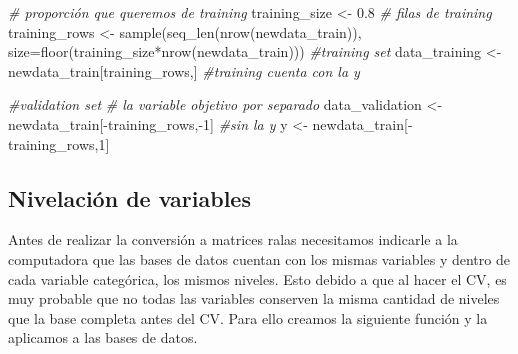 \documentclass[
]{article}
\newenvironment{Shaded}{\begin{snugshade}}{\end{snugshade}}
\newcommand{\AttributeTok}[1]{\textcolor[rgb]{0.77,0.63,0.00}{#1}}
\newcommand{\CommentTok}[1]{\textcolor[rgb]{0.56,0.35,0.01}{\textit{#1}}}
\newcommand{\DecValTok}[1]{\textcolor[rgb]{0.00,0.00,0.81}{#1}}
\newcommand{\FloatTok}[1]{\textcolor[rgb]{0.00,0.00,0.81}{#1}}
\newcommand{\FunctionTok}[1]{\textcolor[rgb]{0.00,0.00,0.00}{#1}}
\newcommand{\NormalTok}[1]{#1}
\newcommand{\OtherTok}[1]{\textcolor[rgb]{0.56,0.35,0.01}{#1}}
\newcommand{\SpecialCharTok}[1]{\textcolor[rgb]{0.00,0.00,0.00}{#1}}
\begin{document}
\begin{Shaded}
\begin{Highlighting}[]
\CommentTok{\# proporción que queremos de training}
\NormalTok{training\_size }\OtherTok{\textless{}{-}} \FloatTok{0.8}
\CommentTok{\# filas de training}
\NormalTok{training\_rows }\OtherTok{\textless{}{-}} \FunctionTok{sample}\NormalTok{(}\FunctionTok{seq\_len}\NormalTok{(}\FunctionTok{nrow}\NormalTok{(newdata\_train)),}
                        \AttributeTok{size=}\FunctionTok{floor}\NormalTok{(training\_size}\SpecialCharTok{*}\FunctionTok{nrow}\NormalTok{(newdata\_train)))}
\CommentTok{\#training set}
\NormalTok{data\_training }\OtherTok{\textless{}{-}}\NormalTok{ newdata\_train[training\_rows,]}
\CommentTok{\#training cuenta con la y}


\CommentTok{\#validation set}
\CommentTok{\# la variable objetivo por separado}
\NormalTok{data\_validation }\OtherTok{\textless{}{-}}\NormalTok{ newdata\_train[}\SpecialCharTok{{-}}\NormalTok{training\_rows,}\SpecialCharTok{{-}}\DecValTok{1}\NormalTok{] }\CommentTok{\#sin la y}
\NormalTok{y }\OtherTok{\textless{}{-}}\NormalTok{ newdata\_train[}\SpecialCharTok{{-}}\NormalTok{training\_rows,}\DecValTok{1}\NormalTok{] }
\end{Highlighting}
\end{Shaded}

\hypertarget{nivelaciuxf3n-de-variables}{%
\subsection{Nivelación de variables}\label{nivelaciuxf3n-de-variables}}

Antes de realizar la conversión a matrices ralas necesitamos indicarle a
la computadora que las bases de datos cuentan con los mismas variables y
dentro de cada variable categórica, los mismos niveles. Esto debido a
que al hacer el CV, es muy probable que no todas las variables conserven
la misma cantidad de niveles que la base completa antes del CV. Para
ello creamos la siguiente función y la aplicamos a las bases de datos.
\end{document}
